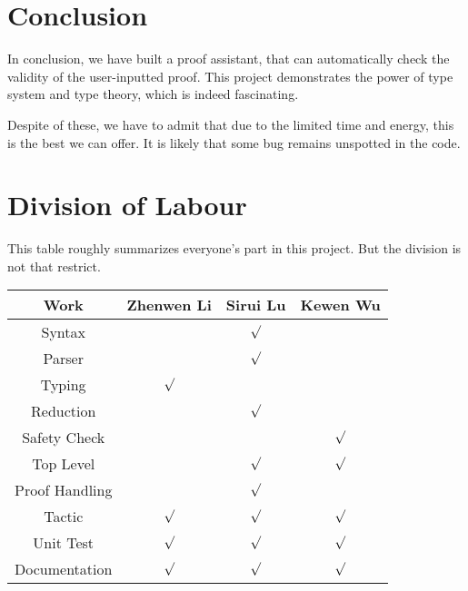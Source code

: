 \section{Conclusion}

In conclusion, we have built a proof assistant, that can automatically check the validity
of the user-inputted proof. This project demonstrates the power of type system and type theory,
which is indeed fascinating.\par
Despite of these, we have to admit that due to the limited time and energy, 
this is the best we can offer. It is likely that some bug remains unspotted in the code.

\section{Division of Labour}

This table roughly summarizes everyone's part in this project. 
But the division is not that restrict.
\begin{center}
\begin{tabular}{|c|c|c|c|}
\hline
Work & Zhenwen Li & Sirui Lu & Kewen Wu\\
\hline
Syntax & & $\surd$ &\\
Parser & & $\surd$ &\\
Typing & $\surd$ & &\\
Reduction & & $\surd$ &\\
Safety Check & & & $\surd$\\
Top Level & & $\surd$ & $\surd$\\
Proof Handling & & $\surd$ & \\
Tactic & $\surd$ & $\surd$ & $\surd$\\
Unit Test & $\surd$ & $\surd$ & $\surd$\\
Documentation & $\surd$ & $\surd$ & $\surd$\\
\hline
\end{tabular}
\end{center}

